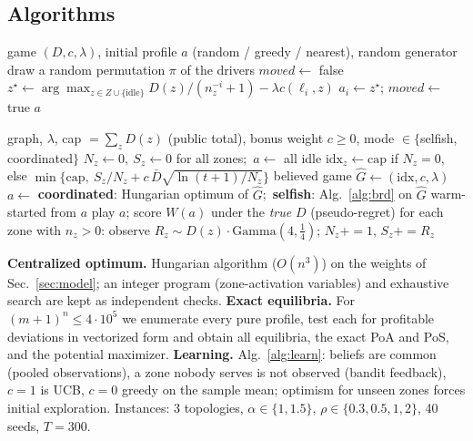 \documentclass[11pt]{article}
\begin{document}
\subsection{Algorithms}
\begin{algorithm}[t]\caption{Asynchronous best-response dynamics (selfish outcome)}\label{alg:brd}\small
\begin{algorithmic}[1]
\Require game $(D,c,\lambda)$, initial profile $a$ (random / greedy / nearest), random generator
\State draw a random permutation $\pi$ of the drivers
\Repeat
 \State $\mathit{moved}\gets$ false
  
  \State $z^\star\gets\arg\max_{z\in Z\cup\{\mathrm{idle}\}}D(z)/(n_z^{-i}+1)-\lambda c(\ell_i,z)$ 
   $a_i\gets z^\star$; $\mathit{moved}\gets$ true \EndIf
 \EndFor
{}
\State \Return $a$ 
\end{algorithmic}\end{algorithm}
\begin{algorithm}[t]\caption{Learning unknown demand (coordinated or selfish)}\label{alg:learn}\small
\begin{algorithmic}[1]
\Require graph, $\lambda$, cap $=\sum_zD(z)$ (public total), bonus weight $c\ge0$, mode $\in\{$selfish, coordinated$\}$
\State $N_z\gets0,\ S_z\gets0$ for all zones;\ $a\gets$ all idle
 \State $\mathrm{idx}_z\gets\mathrm{cap}$ if $N_z=0$, else $\min\{\mathrm{cap},\ S_z/N_z+c\,\bar D\sqrt{\ln(t+1)/N_z}\}$
 \State believed game $\hat G\gets(\mathrm{idx},c,\lambda)$
 \State $a\gets$ \textbf{coordinated}: Hungarian optimum of $\hat G$;\ \textbf{selfish}: Alg.~\ref{alg:brd} on $\hat G$ warm-started from $a$
 \State play $a$; score $W(a)$ under the \emph{true} $D$ (pseudo-regret)
 \State for each zone with $n_z>0$: observe $R_z\sim D(z)\cdot\mathrm{Gamma}(4,\tfrac14)$; $N_z{+}{=}1$, $S_z{+}{=}R_z$
\EndFor
\end{algorithmic}\end{algorithm}
\textbf{Centralized optimum.} Hungarian algorithm ($O(n^3)$) on the weights of Sec.~\ref{sec:model}; an integer program (zone-activation variables) and exhaustive search are kept as independent checks. \textbf{Exact equilibria.} For $(m{+}1)^n\le4\cdot10^5$ we enumerate every pure profile, test each for profitable deviations in vectorized form and obtain all equilibria, the exact PoA and PoS, and the potential maximizer. \textbf{Learning.} Alg.~\ref{alg:learn}: beliefs are common (pooled observations), a zone nobody serves is not observed (bandit feedback), $c=1$ is UCB, $c=0$ greedy on the sample mean; optimism for unseen zones forces initial exploration. Instances: 3 topologies, $\alpha\in\{1,1.5\}$, $\rho\in\{0.3,0.5,1,2\}$, 40 seeds, $T=300$.
\end{document}
